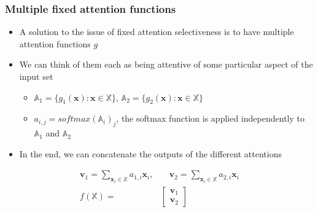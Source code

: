 \documentclass{beamer}
\renewcommand{\vec}[1]{{\boldsymbol{#1}}}
\newcommand{\svec}[2]{{\vec{#1}_{#2}}}
\begin{document}
\begin{frame}
  \frametitle{Multiple fixed attention functions}
  \begin{itemize}
  \item A solution to the issue of fixed attention selectiveness is to have multiple attention functions $g$

  \item We can think of them each as being attentive of some particular aspect of the input set
    \begin{itemize}
    \item $\mathbb{A}_1 = \{ g_1(\vec{x}) : \vec{x} \in \mathbb{X} \}$, $\mathbb{A}_2 = \{ g_2(\vec{x}) : \vec{x} \in \mathbb{X} \}$

    \item $a_{i,j} = softmax(\mathbb{A}_i)_j$, the softmax function is applied independently to $\mathbb{A}_1$ and $\mathbb{A}_2$
    \end{itemize}

  \item In the end, we can concatenate the outputs of the different attentions
  \end{itemize}
        \begin{align*}
        \svec{v}{1} = \sum_{\svec{x}{i} \in \mathbb{X}} a_{1,i} \svec{x}{i},& \quad \svec{v}{2}=\sum_{\svec{x}{i} \in \mathbb{X}} a_{2,i} \svec{x}{i}\\
        f(\mathbb{X}) =& \begin{bmatrix} \svec{v}{1} \\ \svec{v}{2} \end{bmatrix}
      \end{align*}

\end{frame}
\end{document}
